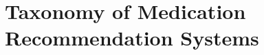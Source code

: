 \documentclass[manuscript,review]{acmart}
\begin{document}

\section{Taxonomy of Medication Recommendation Systems}
\label{sec:taxonomy}
\end{document}
